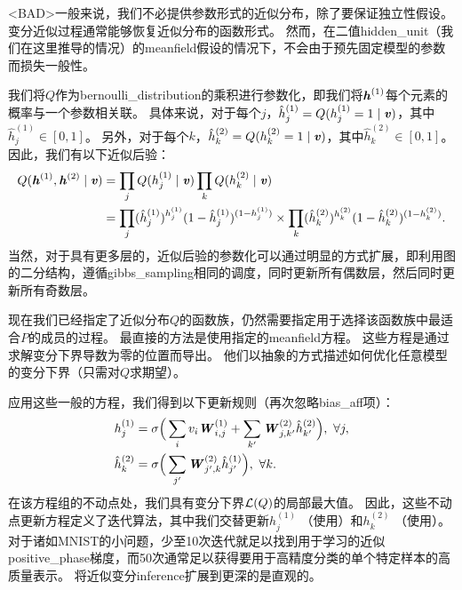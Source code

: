 <BAD>一般来说，我们不必提供参数形式的近似分布，除了要保证独立性假设。
变分近似过程通常能够恢复近似分布的函数形式。
然而，在二值\gls{hidden_unit}（我们在这里推导的情况）的\gls{meanfield}假设的情况下，不会由于预先固定模型的参数而损失一般性。

我们将$Q$作为\gls{bernoulli_distribution}的乘积进行参数化，即我们将$\boldsymbol{\mathit{h}}^{(1)}$每个元素的概率与一个参数相关联。
具体来说，对于每个$j$，$\hat h_j^{(1)} = Q(h_j^{(1)}=1 \mid  \boldsymbol{\mathit{v}})$，其中$\hat h_j^{(1)} \in [0,1]$。
另外，对于每个$k$，$\hat h_k^{(2)} = Q(h_k^{(2)}=1 \mid  \boldsymbol{\mathit{v}})$，其中$\hat h_k^{(2)} \in [0,1]$。
因此，我们有以下近似后验：
\begin{align}
 Q(\boldsymbol{\mathit{h}}^{(1)}, \boldsymbol{\mathit{h}}^{(2)}  \mid  \boldsymbol{\mathit{v}}) &=  \prod_j Q(h_j^{(1)} \mid  \boldsymbol{\mathit{v}}) \prod_k Q(h_k^{(2)}  \mid  \boldsymbol{\mathit{v}}) \\
 &= \prod_j (\hat h_j^{(1)})^{h_j^{(1)}}(1-\hat h_j^{(1)})^{(1-h_j^{(1)})} \times
 \prod_k (\hat h_k^{(2)})^{h_k^{(2)}}(1-\hat h_k^{(2)})^{(1-h_k^{(2)})} .
\end{align}
当然，对于具有更多层的，近似后验的参数化可以通过明显的方式扩展，即利用图的二分结构，遵循\gls{gibbs_sampling}相同的调度，同时更新所有偶数层，然后同时更新所有奇数层。


现在我们已经指定了近似分布$Q$的函数族，仍然需要指定用于选择该函数族中最适合$P$的成员的过程。
最直接的方法是使用指定的\gls{meanfield}方程。
这些方程是通过求解变分下界导数为零的位置而导出。
他们以抽象的方式描述如何优化任意模型的变分下界（只需对$Q$求期望）。

应用这些一般的方程，我们得到以下更新规则（再次忽略\gls{bias_aff}项）：
\begin{align} \label{eq:2033h1}
 h_j^{(1)} &= \sigma  \Big(  \sum_i v_i \boldsymbol{\mathit{W}}_{i,j}^{(1)} 
 + \sum_{k^{\prime}} \boldsymbol{\mathit{W}}_{j,k^{\prime}}^{(2)} \hat h_{k^{\prime}}^{(2)}  \Big), ~\forall j ,\\
 \label{eq:2034h2}
 \hat h_{k}^{(2)} &=  \sigma  \Big(  \sum_{j^{\prime}} \boldsymbol{\mathit{W}}_{j^{\prime},k}^{(2)}
 \hat h_{j^{\prime}}^{(1)}  \Big), ~\forall k.
\end{align}
在该方程组的不动点处，我们具有变分下界$\mathcal{L}(Q)$的局部最大值。
因此，这些不动点更新方程定义了迭代算法，其中我们交替更新$h_{j}^{(1)} $ （使用）和$h_{k}^{(2)} $ （使用）。
对于诸如MNIST的小问题，少至10次迭代就足以找到用于学习的近似\gls{positive_phase}梯度，而50次通常足以获得要用于高精度分类的单个特定样本的高质量表示。
将近似变分\gls{inference}扩展到更深的是直观的。


